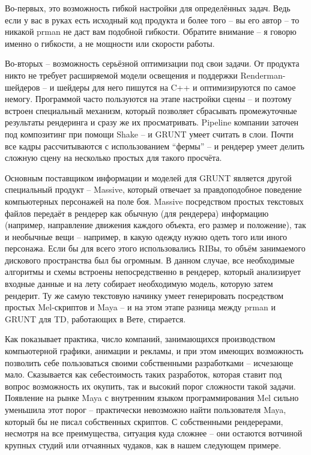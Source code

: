  Во-первых, это возможность гибкой настройки для
    определённых задач. Ведь если у вас в руках есть исходный код
    продукта и более того – вы его автор – то никакой prman не даст вам
    подобной гибкости. Обратите внимание – я говорю именно о гибкости,
    а не мощности или скорости работы.
  

 Во-вторых – возможность серьёзной оптимизации под
    свои задачи. От продукта никто не требует расширяемой модели
    освещения и поддержки Renderman-шейдеров – и шейдеры для него
    пишутся на C++ и оптимизируются по самое немогу. Программой часто
    пользуются на этапе настройки сцены – и поэтому встроен специальный
    механизм, который позволяет сбрасывать промежуточные результаты
    рендеринга и сразу же их просматривать. Pipeline компании заточен
    под композитинг при помощи Shake – и GRUNT умеет считать в слои.
    Почти все кадры рассчитываются с использованием “фермы” – и
    рендерер умеет делить сложную сцену на несколько простых для такого
    просчёта.
  

 Основным поставщиком информации и моделей для GRUNT
    является другой специальный продукт – Massive, который отвечает за
    правдоподобное поведение компьютерных персонажей на поле боя.
    Massive посредством простых текстовых файлов передаёт в рендерер
    как обычную (для рендерера) информацию (например, направление
    движения каждого объекта, его размер и положение), так и необычные
    вещи – например, в какую одежду нужно одеть того или иного
    персонажа. Если бы для всего этого использовались RIBы, то объём
    занимаемого дискового пространства был бы огромным. В данном
    случае, все необходимые алгоритмы и схемы встроены непосредственно
    в рендерер, который анализирует входные данные и на лету собирает
    необходимую модель, которую затем рендерит. Ту же самую текстовую
    начинку умеет генерировать посредством простых Mel-скриптов и Maya
    – и на этом этапе разница между prman и GRUNT для TD, работающих в
    Вете, стирается.
  

 Как показывает практика, число компаний,
    занимающихся производством компьютерной графики, анимации и
    рекламы, и при этом имеющих возможность позволить себе пользоваться
    своими собственными разработками – исчезающе мало. Сказывается как
    себестоимость таких разработок, которая ставит под вопрос
    возможность их окупить, так и высокий порог сложности такой задачи.
    Появление на рынке Maya с внутренним языком программирования Mel
    сильно уменьшила этот порог – практически невозможно найти
    пользователя Maya, который бы не писал собственных скриптов. С
    собственными рендерерами, несмотря на все преимущества, ситуация
    куда сложнее – они остаются вотчиной крупных студий или отчаянных
    чудаков, как в нашем следующем примере.
  
